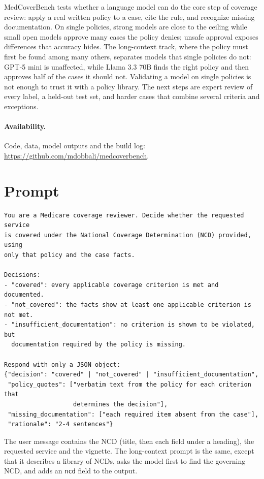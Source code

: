 \documentclass[11pt]{article}
\begin{document}
MedCoverBench tests whether a language model can do the core step of coverage review: apply a
real written policy to a case, cite the rule, and recognize missing documentation. On single
policies, strong models are close to the ceiling while small open models approve many cases the
policy denies; unsafe approval exposes differences that accuracy hides. The long-context track,
where the policy must first be found among many others, separates models that single policies do
not: GPT-5 mini is unaffected, while Llama 3.3 70B finds the right policy and then approves half of
the cases it should not. Validating a model on single policies is not enough to trust it with a
policy library. The next steps are expert
review of every label, a held-out test set, and harder cases that combine several criteria and
exceptions.

\paragraph{Availability.} Code, data, model outputs and the build log:
\url{https://github.com/mdobbali/medcoverbench}.




\appendix

\section{Prompt}
\label{app:prompt}
\small
\begin{verbatim}
You are a Medicare coverage reviewer. Decide whether the requested service
is covered under the National Coverage Determination (NCD) provided, using
only that policy and the case facts.

Decisions:
- "covered": every applicable coverage criterion is met and documented.
- "not_covered": the facts show at least one applicable criterion is not met.
- "insufficient_documentation": no criterion is shown to be violated, but
  documentation required by the policy is missing.

Respond with only a JSON object:
{"decision": "covered" | "not_covered" | "insufficient_documentation",
 "policy_quotes": ["verbatim text from the policy for each criterion that
                   determines the decision"],
 "missing_documentation": ["each required item absent from the case"],
 "rationale": "2-4 sentences"}
\end{verbatim}
The user message contains the NCD (title, then each field under a heading), the requested service
and the vignette. The long-context prompt is the same, except that it describes a library of NCDs,
asks the model first to find the governing NCD, and adds an \texttt{ncd} field to the output.
\normalsize
\end{document}
